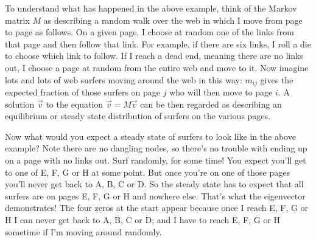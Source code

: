 \documentclass[11pt]{amsbook}
\theoremstyle{definition}
\begin{document}
To understand what has happened in the above example, think of the Markov matrix $M$ as describing a random walk over the web in which I move from page to page as follows. On a given page, I choose at random one of the links from that page and then follow that link. For example, if there are six links, I roll a die to choose which link to follow. If I reach a dead end, meaning there are no links out, I choose a page at random from the entire web and move to it. Now imagine lots and lots of web surfers moving around the web in this way: $m_{ij}$ gives the expected fraction of those surfers on page $j$ who will then move to page $i$. A solution $\vec{v}$ to the equation $\vec{v} = M\vec{v}$ can be then regarded as describing an equilibrium or steady state distribution of surfers on the various pages.

Now what would you expect a steady state of surfers to look like in the above example? Note there are no dangling nodes, so there's no trouble with ending up on a page with no links out. Surf randomly, for some time! You expect you'll get to one of E, F, G or H at some point. But once you're on one of those pages you'll never get back to A, B, C  or D. So the steady state has to expect that all surfers are on pages E, F, G or H and nowhere else. That's what the eigenvector demonstrates! The four zeros at the start appear because once I reach E, F, G or H I can never get back to A, B, C or D; and I have to reach E, F, G or H sometime if I'm moving around randomly.
\end{document}
